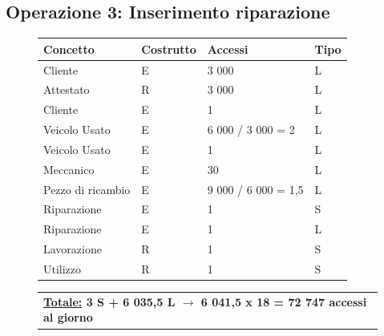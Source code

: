 \documentclass[a4paper,12pt]{report}
\begin{document}
\subsection*{Operazione 3: Inserimento riparazione}
\begin{figure}[H]
	\centering
	\begin{tabular}{L{3.7cm}C{2.2cm}C{4.7cm}C{2cm}}
		\rule[-2mm]{0mm}{0.6cm}{}
		\textbf{Concetto} & \textbf{Costrutto} &\textbf{Accessi} & \textbf{Tipo} \\
		\hline\rule[-2mm]{0mm}{0.65cm}{}
		Cliente & E & 3 000 & L \\
		\hline\rule[-2mm]{0mm}{0.65cm}{}
		Attestato & R & 3 000 & L \\
		\hline\rule[-2mm]{0mm}{0.65cm}{}
		Cliente & E & 1 & L \\
		\hline\rule[-2mm]{0mm}{0.65cm}{}
		Veicolo Usato & E & 6 000 / 3 000 = 2 & L \\
		\hline\rule[-2mm]{0mm}{0.65cm}{}
		Veicolo Usato & E & 1 & L \\
		\hline\rule[-2mm]{0mm}{0.65cm}{}
		Meccanico & E & 30 & L \\
		\hline\rule[-2mm]{0mm}{0.65cm}{}
		Pezzo di ricambio & E & 9 000 / 6 000 = 1,5 & L \\
		\hline\rule[-2mm]{0mm}{0.65cm}{}
		Riparazione & E & 1 & S \\
		\hline\rule[-2mm]{0mm}{0.65cm}{}
		Riparazione & E & 1 & L \\
		\hline\rule[-2mm]{0mm}{0.65cm}{}
		Lavorazione & R & 1 & S \\
		\hline\rule[-2mm]{0mm}{0.65cm}{}
		Utilizzo & R & 1 & S \\
	\end{tabular}
	
	\begin{tabular}{C{13.9cm}}
		\rule[-3mm]{0mm}{0.85cm}{}	
		 \textbf{\underline{Totale:} 3 S +  6 035,5 L $\to$ 6 041,5 x 18 = 72 747 accessi al giorno}
	\end{tabular}
\end{figure}

\newpage
\end{document}
